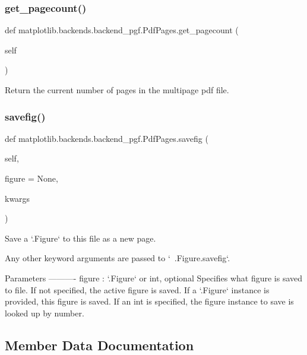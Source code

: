 \subsubsection{\texorpdfstring{get\+\_\+pagecount()}{get\_pagecount()}}
{\footnotesize\ttfamily def matplotlib.\+backends.\+backend\+\_\+pgf.\+Pdf\+Pages.\+get\+\_\+pagecount (\begin{DoxyParamCaption}\item[{}]{self }\end{DoxyParamCaption})}

\begin{DoxyVerb}Return the current number of pages in the multipage pdf file.\end{DoxyVerb}
 \mbox{\label{classmatplotlib_1_1backends_1_1backend__pgf_1_1PdfPages_aa4381cce96ba1f47fa23fe757cb3cd21}} 
\subsubsection{\texorpdfstring{savefig()}{savefig()}}
{\footnotesize\ttfamily def matplotlib.\+backends.\+backend\+\_\+pgf.\+Pdf\+Pages.\+savefig (\begin{DoxyParamCaption}\item[{}]{self,  }\item[{}]{figure = {\ttfamily None},  }\item[{}]{kwargs }\end{DoxyParamCaption})}

\begin{DoxyVerb}Save a `.Figure` to this file as a new page.

Any other keyword arguments are passed to `~.Figure.savefig`.

Parameters
----------
figure : `.Figure` or int, optional
    Specifies what figure is saved to file. If not specified, the
    active figure is saved. If a `.Figure` instance is provided, this
    figure is saved. If an int is specified, the figure instance to
    save is looked up by number.
\end{DoxyVerb}
 

\subsection{Member Data Documentation}
\mbox{\label{classmatplotlib_1_1backends_1_1backend__pgf_1_1PdfPages_a75ae9bf1292bb1d603d8debf3f390ad6}} 
